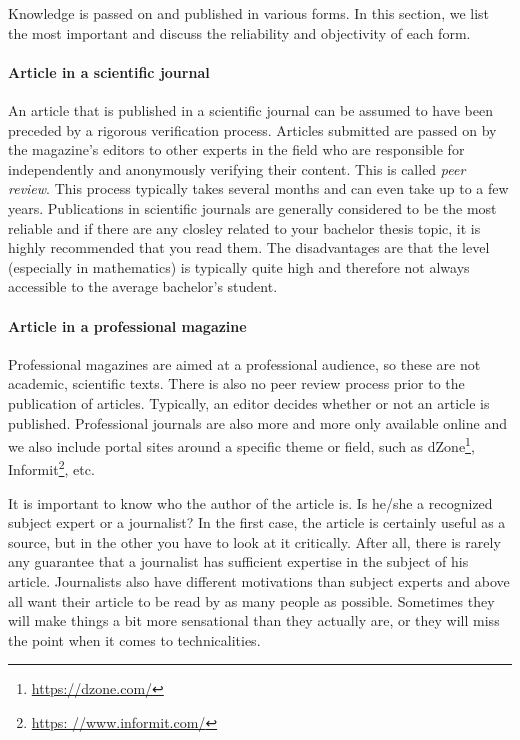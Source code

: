 Knowledge is passed on and published in various forms. In this section, we list the most important and discuss the reliability and objectivity of each form.

\paragraph{Article in a scientific journal}

An article that is published in a scientific journal can be assumed to have been preceded by a rigorous verification process. Articles submitted are passed on by the magazine's editors to other experts in the field who are responsible for independently and anonymously verifying their content. This is called \emph{peer review}. This process typically takes several months and can even take up to a few years. Publications in scientific journals are generally considered to be the most reliable and if there are any closley related to your bachelor thesis topic, it is highly recommended that you read them. The disadvantages are that the level (especially in mathematics) is typically quite high and therefore not always accessible to the average bachelor's student.

\paragraph{Article in a professional magazine}

Professional magazines are aimed at a professional audience, so these are not academic, scientific texts. There is also no peer review process prior to the publication of articles. Typically, an editor decides whether or not an article is published. Professional journals are also more and more only available online and we also include portal sites around a specific theme or field, such as dZone\footnote{\url{https://dzone.com/}}, Informit\footnote{\url{https: //www.informit.com/}}, etc.

It is important to know who the author of the article is. Is he/she a recognized subject expert or a journalist? In the first case, the article is certainly useful as a source, but in the other you have to look at it critically. After all, there is rarely any guarantee that a journalist has sufficient expertise in the subject of his article. Journalists also have different motivations than subject experts and above all want their article to be read by as many people as possible. Sometimes they will make things a bit more sensational than they actually are, or they will miss the point when it comes to technicalities.
